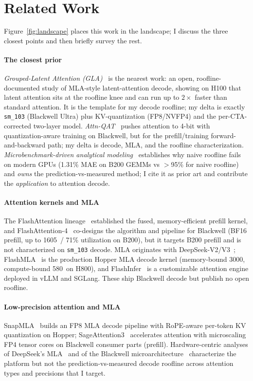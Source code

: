 \section{Related Work}
\label{sec:related}

Figure~\ref{fig:landscape} places this work in the landscape; I discuss the
three closest points and then briefly survey the rest.

\paragraph{The closest prior}
\emph{Grouped-Latent Attention (GLA)}~\cite{gla} is the nearest work: an open,
roofline-documented study of MLA-style latent-attention decode, showing on H100
that latent attention sits at the roofline knee and can run up to $2\times$ faster
than standard attention. It is the template for my decode roofline; my delta is
exactly \texttt{sm\_103} (Blackwell Ultra) plus KV-quantization (FP8/NVFP4) and
the per-CTA-corrected two-layer model.
\emph{Attn-QAT}~\cite{attnqat} pushes attention to 4-bit with quantization-aware
training on Blackwell, but for the prefill/training forward-and-backward path; my
delta is decode, MLA, and the roofline characterization.
\emph{Microbenchmark-driven analytical modeling}~\cite{roofmethod} establishes why
naive roofline fails on modern GPUs (1.31\% MAE on B200 GEMMs vs $>$95\% for naive
roofline) and \emph{owns} the prediction-vs-measured method; I cite it as prior
art and contribute the \emph{application} to attention decode.

\paragraph{Attention kernels and MLA}
The FlashAttention lineage~\cite{fa1,fa2,fa3} established the fused,
memory-efficient prefill kernel, and FlashAttention-4~\cite{fa4} co-designs the
algorithm and pipeline for Blackwell (BF16 prefill, up to 1605\tflops\ / 71\%
utilization on B200), but it targets B200 prefill and is not characterized on
\texttt{sm\_103} decode. MLA originates with DeepSeek-V2/V3~\cite{deepseekv2,%
deepseekv3}; FlashMLA~\cite{flashmla} is the production Hopper MLA decode kernel
(memory-bound 3000\gbs, compute-bound 580\tflops\ on H800), and
FlashInfer~\cite{flashinfer} is a customizable attention engine deployed in vLLM
and SGLang. These ship Blackwell decode but publish no open roofline.

\paragraph{Low-precision attention and MLA}
SnapMLA~\cite{snapmla} builds an FP8 MLA decode pipeline with RoPE-aware
per-token KV quantization on Hopper; SageAttention3~\cite{sage3} accelerates
attention with microscaling FP4 tensor cores on Blackwell consumer parts
(prefill). Hardware-centric analyses of DeepSeek's MLA~\cite{deepseekhw} and of
the Blackwell microarchitecture~\cite{blackwellubench} characterize the platform
but not the prediction-vs-measured decode roofline across attention types and
precisions that I target.
